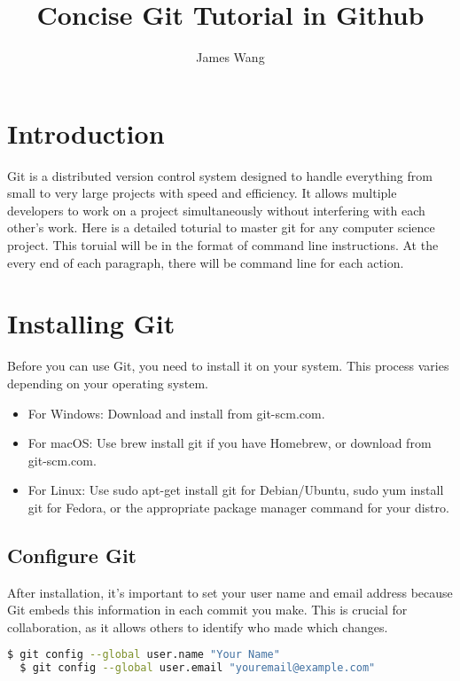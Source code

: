 \documentclass[10pt,twocolumn]{article}
\title{Concise Git Tutorial in Github}
\author{James Wang}
\affiliation{Occidental College}
\begin{document}
\maketitle

\section{Introduction}

Git is a distributed version control system designed to handle everything from small to very large projects with speed and efficiency. It allows multiple developers to work on a project simultaneously without interfering with each other's work. Here is a detailed toturial to master git for any computer science project. This toruial will be in the format of command line instructions. At the every end of each paragraph, there will be command line for each action.

\section{Installing Git}

Before you can use Git, you need to install it on your system. This process varies depending on your operating system.
\begin{itemize}
    \item For Windows: Download and install from git-scm.com.
    \item For macOS: Use brew install git if you have Homebrew, or download from git-scm.com.
    \item For Linux: Use sudo apt-get install git for Debian/Ubuntu, sudo yum install git for Fedora, or the appropriate package manager command for your distro.
\end{itemize}

\subsection{Configure Git}

After installation, it's important to set your user name and email address because Git embeds this information in each commit you make. This is crucial for collaboration, as it allows others to identify who made which changes.

\begin{lstlisting}[language=bash]
  $ git config --global user.name "Your Name"
  $ git config --global user.email "youremail@example.com"
\end{lstlisting}
\end{document}

